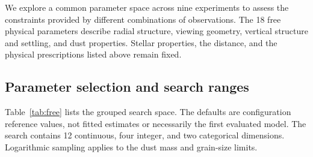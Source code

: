 \documentclass[11pt,a4paper]{article}
\begin{document}
We explore a common parameter space across nine experiments to assess the
constraints provided by different combinations of observations. The
18 free physical parameters describe radial structure, viewing geometry,
vertical structure and settling, and dust properties. Stellar properties,
the distance, and the physical prescriptions listed above remain fixed.

\subsection{Parameter selection and search ranges}

Table~\ref{tab:free} lists the grouped search space. The defaults are
configuration reference values, not fitted estimates or necessarily the
first evaluated model. The search contains 12 continuous, four integer,
and two categorical dimensions. Logarithmic sampling applies to the dust
mass and grain-size limits.
\end{document}
